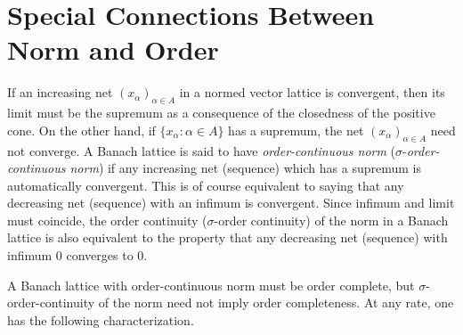 \section{Special Connections Between Norm and Order}\label{sec:c1-5}%
If an increasing net $ (x_{\alpha})_{\alpha\in A} $ in a normed vector lattice is convergent, then its limit must be the supremum as a consequence of the closedness of the positive cone.
On the other hand, if\/ $ \{x_{\alpha} \colon \alpha \in A\} $ has a supremum, the net $ (x_{\alpha})_{\alpha\in A} $ need not converge.
A Banach lattice is said to have \emph{order-continuous norm} ($ \sigma $-\emph{order-continuous norm}) if any increasing net (sequence) which has a supremum is automatically convergent.
This is of course equivalent to saying that any decreasing net (sequence) with an infimum is convergent.
Since infimum and limit must coincide, the order continuity ($ \sigma $-order continuity) of the norm in a Banach lattice is also equivalent to the property that any decreasing net (sequence) with infimum $ 0 $ converges to $ 0 $.

A Banach lattice with order-continuous norm must be order complete, but $ \sigma $-order-continuity of the norm need not imply order completeness.
At any rate, one has the following characterization.

